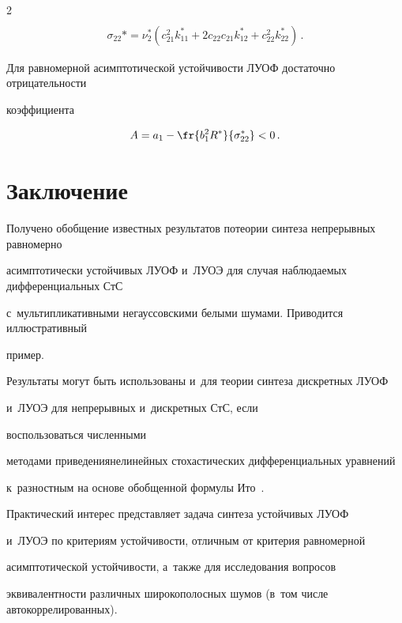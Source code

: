 \begin{multicols}{2}
\begin{gather*}
    \\

    \sigma_{22}* = \nu_2^* (c_{21}^2 k_{11}^* + 2 c_{22} c_{21} k_{12}^* + c_{22}^2 k_{22}^*)\,. %

    \end{gather*}



Для равномерной асимптотической устойчи\-вости ЛУОФ достаточно отрицательности

коэффициента

    $$

    A= a_1 -\fr{b_1^2 R^*}{\sigma_{22}^*} < 0\,. %

    $$



\section{Заключение}



Получено обобщение известных результатов по\linebreak теории синтеза непрерывных равномерно

асимптотически устойчивых ЛУОФ и~ЛУОЭ для случая наблюдаемых дифференциальных СтС

с~мульти\-пликативными негауссовскими белыми шумами.  Приводится иллюстративный

пример.



Результаты могут быть использованы и~для \mbox{тео\-рии} синтеза дискретных ЛУОФ

и~ЛУОЭ для не\-пре\-рыв\-ных и~дискретных СтС, если

воспользоваться численными

методами приведения\linebreak нелинейных стохастических дифференциальных уравнений

к~разностным на основе обобщенной форму\-лы Ито~\cite{2-sk, 8-sk}.



Практический интерес представляет задача синтеза устойчивых ЛУОФ

и~ЛУОЭ по критериям устойчивости, отличным от критерия равномерной

асимптотической устойчивости, а~также для исследования вопросов

эквивалентности различных широкополосных шумов (в~том числе автокоррелированных).






\end{multicols}
